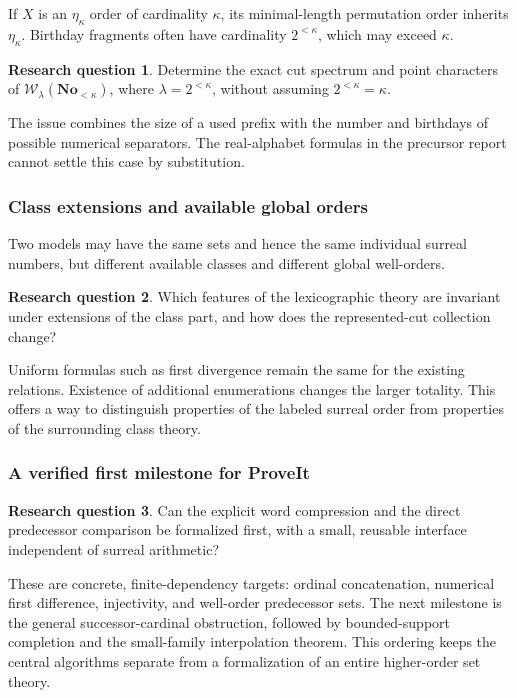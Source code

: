 \documentclass[11pt]{article}
\theoremstyle{definition}
\newtheorem{question}[question]{Research question}
\theoremstyle{remark}
\newcommand{\No}{\mathbf{No}}
\newcommand{\WO}{\mathcal W}
\begin{document}
If \(X\) is an \(\eta_\kappa\) order of cardinality
\(\kappa\), its minimal-length permutation order inherits
\(\eta_\kappa\). Birthday fragments often have cardinality
\(2^{<\kappa}\), which may exceed \(\kappa\).

\begin{question}\label{swo:n16.7}
Determine the exact cut spectrum and point characters of
\(\WO_\lambda(\No_{<\kappa})\), where
\(\lambda=2^{<\kappa}\), without assuming
\(2^{<\kappa}=\kappa\).
\end{question}

The issue combines the size of a used prefix with the
number and birthdays of possible numerical separators.
The real-alphabet formulas in the precursor report
cannot settle this case by substitution.

\subsubsection{Class extensions and available global orders}

Two models may have the same sets and hence the same
individual surreal numbers, but different available
classes and different global well-orders.

\begin{question}\label{swo:n16.8}
Which features of the lexicographic theory are invariant
under extensions of the class part, and how does the
represented-cut collection change?
\end{question}

Uniform formulas such as first divergence remain the
same for the existing relations. Existence of additional
enumerations changes the larger totality. This offers a
way to distinguish properties of the labeled surreal
order from properties of the surrounding class theory.

\subsubsection{A verified first milestone for ProveIt}

\begin{question}\label{swo:n16.9}
Can the explicit word compression and the direct
predecessor comparison be formalized first, with a small,
reusable interface independent of surreal arithmetic?
\end{question}

These are concrete, finite-dependency targets:
ordinal concatenation, numerical first difference,
injectivity, and well-order predecessor sets. The next
milestone is the general successor-cardinal obstruction,
followed by bounded-support completion and the
small-family interpolation theorem. This ordering keeps
the central algorithms separate from a formalization of
an entire higher-order set theory.
\end{document}
